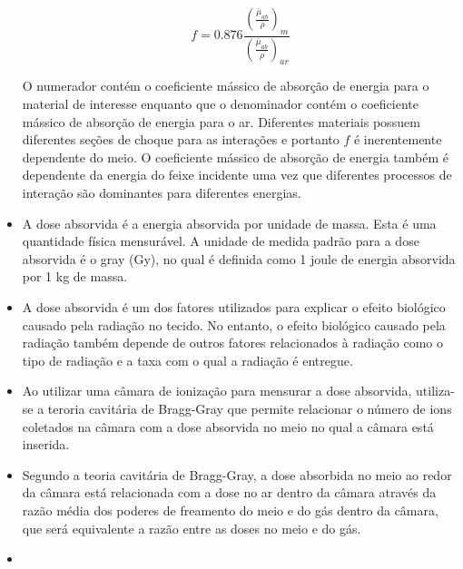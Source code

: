 \documentclass[11pt,a4paper]{article}
\newcounter{exemplo}
\begin{document}
\begin{exemplo}
\begin{itemize}
            $$f = 0.876 \frac{\left(\frac{\bar{\mu}_{ab}}{\rho}\right)_m}{\left(\frac{\bar{\mu}_{ab}}{\rho}\right)_{ar}}$$

        O numerador contém o coeficiente mássico de absorção de energia para o material de interesse enquanto que o denominador contém o coeficiente mássico de absorção de energia para o ar. Diferentes materiais possuem diferentes seções de choque para as interações e portanto $f$ é inerentemente dependente do meio. O coeficiente mássico de absorção de energia também é dependente da energia do feixe incidente uma vez que diferentes processos de interação são dominantes para diferentes energias. 

        \item A dose absorvida é a energia absorvida por unidade de massa. Esta é uma quantidade física mensurável. A unidade de medida padrão para a dose absorvida é o gray (Gy), no qual é definida como 1 joule de energia absorvida por 1 kg de massa.
        
        \item A dose absorvida é um dos fatores utilizados para explicar o efeito biológico causado pela radiação no tecido. No entanto, o efeito biológico causado pela radiação também depende de outros fatores relacionados à radiação como o tipo de radiação e a taxa com o qual a radiação é entregue.
        
        \item Ao utilizar uma câmara de ionização para mensurar a dose absorvida, utiliza-se a teroria cavitária de Bragg-Gray que permite relacionar o número de ions coletados na câmara com a dose absorvida no meio no qual a câmara está inserida. 
        
        \item Segundo a teoria cavitária de Bragg-Gray, a dose absorbida no meio ao redor da câmara está relacionada com a dose no ar dentro da câmara através da razão média dos poderes de freamento do meio e do gás dentro da câmara, que será equivalente a razão entre as doses no meio e do gás. 
    \end{itemize}
\end{exemplo}

\begin{exemplo}
    \begin{itemize}
        \item 
    \end{itemize}
\end{exemplo}
\end{document}
